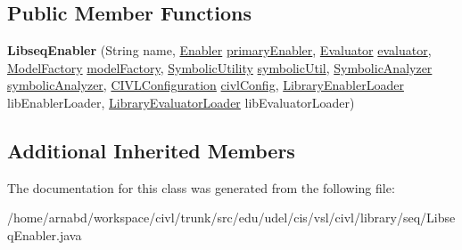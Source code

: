 \subsection*{Public Member Functions}
\begin{DoxyCompactItemize}
\item 
\hypertarget{classedu_1_1udel_1_1cis_1_1vsl_1_1civl_1_1library_1_1seq_1_1LibseqEnabler_a69c6d5aff858924e6f2d5aee3013a5ea}{}{\bfseries Libseq\+Enabler} (String name, \hyperlink{interfaceedu_1_1udel_1_1cis_1_1vsl_1_1civl_1_1kripke_1_1IF_1_1Enabler}{Enabler} \hyperlink{classedu_1_1udel_1_1cis_1_1vsl_1_1civl_1_1library_1_1common_1_1BaseLibraryEnabler_a1a2cc978c11d389f54863cad585bff44}{primary\+Enabler}, \hyperlink{interfaceedu_1_1udel_1_1cis_1_1vsl_1_1civl_1_1semantics_1_1IF_1_1Evaluator}{Evaluator} \hyperlink{classedu_1_1udel_1_1cis_1_1vsl_1_1civl_1_1library_1_1common_1_1BaseLibraryEnabler_aef497c183004fbfa8dd113033c0c4275}{evaluator}, \hyperlink{interfaceedu_1_1udel_1_1cis_1_1vsl_1_1civl_1_1model_1_1IF_1_1ModelFactory}{Model\+Factory} \hyperlink{classedu_1_1udel_1_1cis_1_1vsl_1_1civl_1_1library_1_1common_1_1LibraryComponent_ac38a7c7971f70f8c969e55538a17f016}{model\+Factory}, \hyperlink{interfaceedu_1_1udel_1_1cis_1_1vsl_1_1civl_1_1dynamic_1_1IF_1_1SymbolicUtility}{Symbolic\+Utility} \hyperlink{classedu_1_1udel_1_1cis_1_1vsl_1_1civl_1_1library_1_1common_1_1LibraryComponent_a18214426269e7c352f4926264837c8a6}{symbolic\+Util}, \hyperlink{interfaceedu_1_1udel_1_1cis_1_1vsl_1_1civl_1_1semantics_1_1IF_1_1SymbolicAnalyzer}{Symbolic\+Analyzer} \hyperlink{classedu_1_1udel_1_1cis_1_1vsl_1_1civl_1_1library_1_1common_1_1LibraryComponent_a7a1213c02b2d29a79f550c7090594967}{symbolic\+Analyzer}, \hyperlink{classedu_1_1udel_1_1cis_1_1vsl_1_1civl_1_1config_1_1IF_1_1CIVLConfiguration}{C\+I\+V\+L\+Configuration} \hyperlink{classedu_1_1udel_1_1cis_1_1vsl_1_1civl_1_1library_1_1common_1_1LibraryComponent_a223e603cab7a909db88f49c256b2ce98}{civl\+Config}, \hyperlink{interfaceedu_1_1udel_1_1cis_1_1vsl_1_1civl_1_1kripke_1_1IF_1_1LibraryEnablerLoader}{Library\+Enabler\+Loader} lib\+Enabler\+Loader, \hyperlink{interfaceedu_1_1udel_1_1cis_1_1vsl_1_1civl_1_1semantics_1_1IF_1_1LibraryEvaluatorLoader}{Library\+Evaluator\+Loader} lib\+Evaluator\+Loader)\label{classedu_1_1udel_1_1cis_1_1vsl_1_1civl_1_1library_1_1seq_1_1LibseqEnabler_a69c6d5aff858924e6f2d5aee3013a5ea}

\end{DoxyCompactItemize}
\subsection*{Additional Inherited Members}


The documentation for this class was generated from the following file\+:\begin{DoxyCompactItemize}
\item 
/home/arnabd/workspace/civl/trunk/src/edu/udel/cis/vsl/civl/library/seq/Libseq\+Enabler.\+java\end{DoxyCompactItemize}
